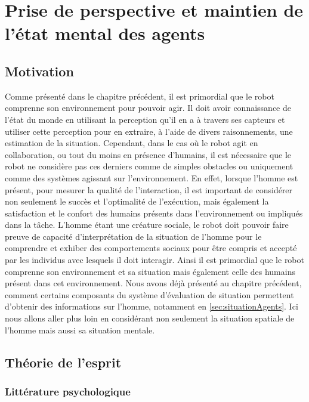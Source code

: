 \documentclass[a4paper,11pt,twoside]{StyleThese}
\begin{document}
\setcounter{chapter}{2} %
\dominitoc
\faketableofcontents
\fi

\chapter{Prise de perspective et maintien de l'état mental des agents}
\label{chapter2}
\minitoc

\section{Motivation}
\label{sec:motivation}
Comme présenté dans le chapitre précédent, il est primordial que le robot comprenne son environnement pour pouvoir agir. Il doit avoir connaissance de l'état du monde en utilisant la perception qu'il en a à travers ses capteurs et utiliser cette perception pour en extraire, à l'aide de divers raisonnements, une estimation de la situation. Cependant, dans le cas où le robot agit en collaboration, ou tout du moins en présence d'humains, il est nécessaire que le robot ne considère pas ces derniers comme de simples obstacles ou uniquement comme des systèmes agissant sur l'environnement. En effet, lorsque l'homme est présent, pour mesurer la qualité de l'interaction, il est important de considérer non seulement le succès et l'optimalité de l'exécution, mais également la satisfaction et le confort des humains présents dans l'environnement ou impliqués dans la tâche. L'homme étant une créature sociale, le robot doit pouvoir faire preuve de capacité d'interprétation de la situation de l'homme pour le comprendre et exhiber des comportements sociaux pour être compris et accepté par les individus avec lesquels il doit interagir.
Ainsi il est primordial que le robot comprenne son environnement et sa situation mais également celle des humains présent dans cet environnement.
Nous avons déjà présenté au chapitre précédent, comment certains composants du système d'évaluation de situation permettent d'obtenir des informations sur l'homme, notamment en \ref{sec:situationAgents}. Ici nous allons aller plus loin en considérant non seulement la situation spatiale de l'homme mais aussi sa situation mentale.

\section{Théorie de l'esprit}
\subsection{Littérature psychologique}
\label{sec:psy}
\end{document}
